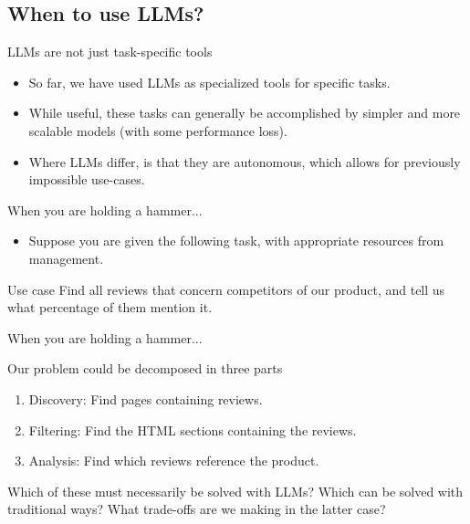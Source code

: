 \documentclass[24pt]{beamer}
\begin{document}
\subsection{When to use LLMs?}

\begin{frame}
	\sectionpage
	\subsectionpage
\end{frame}

\begin{frame}{LLMs are not just task-specific tools}
	\begin{itemize}
		\item So far, we have used LLMs as specialized tools for specific tasks.
		\item While useful, these tasks can generally be accomplished by \alert{simpler} and more \alert{scalable} models (with some performance loss).
		\item Where LLMs differ, is that they are \alert{autonomous}, which allows for \alert{previously impossible} use-cases.
	\end{itemize}
\end{frame}

\begin{frame}{When you are holding a hammer...}
	\begin{itemize}
		\item Suppose you are given the following task, with appropriate resources from management.
	\end{itemize}
	\begin{exampleblock}{Use case}
		Find all reviews that concern competitors of our product, and tell us what percentage of them mention it.
	\end{exampleblock}
\end{frame}

\begin{frame}{When you are holding a hammer...}   	
	\begin{block}{Our problem could be decomposed in three parts}  		
		\begin{enumerate}
			\item Discovery: Find pages containing reviews.
			\item Filtering: Find the HTML sections containing the reviews.
			\item Analysis: Find which reviews reference the product.
		\end{enumerate}
	\end{block}
   	
	\begin{alertblock}{}
		Which of these must necessarily be solved with LLMs? Which can be solved with traditional ways? What trade-offs are we making in the latter case?
	\end{alertblock}
\end{frame}
\end{document}
